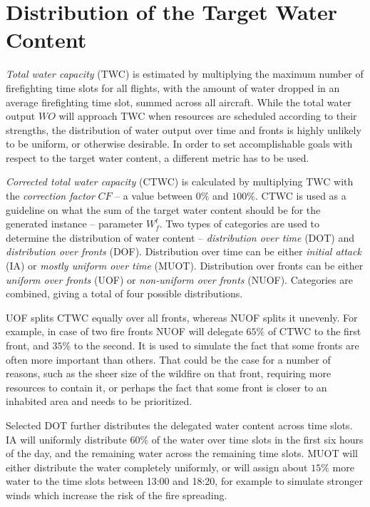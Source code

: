 \section{Distribution of the Target Water Content}\label{sec:water-distribution}

\textit{Total water capacity} (TWC) is estimated by multiplying the maximum number of firefighting time slots for all flights, with the amount of water dropped in an average firefighting time slot, summed across all aircraft.
While the total water output $\mathit{WO}$ will approach TWC when resources are scheduled according to their strengths, the distribution of water output over time and fronts is highly unlikely to be uniform, or otherwise desirable.
In order to set accomplishable goals with respect to the target water content, a different metric has to be used.

\textit{Corrected total water capacity} (CTWC) is calculated by multiplying TWC with the \textit{correction factor} $\mathit{CF}$ -- a value between $0\%$ and $100\%$.
CTWC is used as a guideline on what the sum of the target water content should be for the generated instance -- parameter $W_f^t$.
Two types of categories are used to determine the distribution of water content -- \textit{distribution over time} (DOT) and \textit{distribution over fronts} (DOF).
Distribution over time can be either \textit{initial attack} (IA) or \textit{mostly uniform over time} (MUOT).
Distribution over fronts can be either \textit{uniform over fronts} (UOF) or \textit{non-uniform over fronts} (NUOF).
Categories are combined, giving a total of four possible distributions.

UOF splits CTWC equally over all fronts, whereas NUOF splits it unevenly.
For example, in case of two fire fronts NUOF will delegate $65\%$ of CTWC to the first front, and $35\%$ to the second.
It is used to simulate the fact that some fronts are often more important than others.
That could be the case for a number of reasons, such as the sheer size of the wildfire on that front, requiring more resources to contain it, or perhaps the fact that some front is closer to an inhabited area and needs to be prioritized.

Selected DOT further distributes the delegated water content across time slots.
IA will uniformly distribute $60\%$ of the water over time slots in the first six hours of the day, and the remaining water across the remaining time slots.
MUOT will either distribute the water completely uniformly, or will assign about $15\%$ more water to the time slots between 13:00 and 18:20, for example to simulate stronger winds which increase the risk of the fire spreading.


